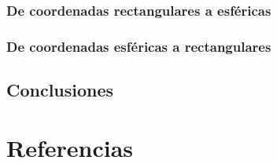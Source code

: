 \documentclass[letterpaper,14pt]{extreport} %
\begin{document}
    \subsection{De coordenadas rectangulares a esféricas}
        
    \subsection{De coordenadas esféricas a rectangulares}
        
  \section{Conclusiones}
    
  
  \chapter{Referencias}
    
  
\end{document}
